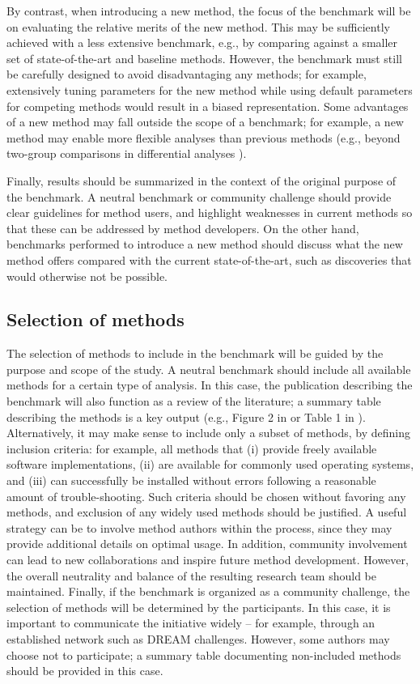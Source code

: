 By contrast, when introducing a new method, the focus of the benchmark will be on evaluating the relative merits of the new method. This may be sufficiently achieved with a less extensive benchmark, e.g., by comparing against a smaller set of state-of-the-art and baseline methods. However, the benchmark must still be carefully designed to avoid disadvantaging any methods; for example, extensively tuning parameters for the new method while using default parameters for competing methods would result in a biased representation. Some advantages of a new method may fall outside the scope of a benchmark; for example, a new method may enable more flexible analyses than previous methods (e.g., beyond two-group comparisons in differential analyses \cite{weber_diffcytdifferentialdiscovery_2019}).

Finally, results should be summarized in the context of the original purpose of the benchmark. A neutral benchmark or community challenge should provide clear guidelines for method users, and highlight weaknesses in current methods so that these can be addressed by method developers. On the other hand, benchmarks performed to introduce a new method should discuss what the new method offers compared with the current state-of-the-art, such as discoveries that would otherwise not be possible.

\subsection{Selection of methods}

The selection of methods to include in the benchmark will be guided by the purpose and scope of the study. A neutral benchmark should include all available methods for a certain type of analysis. In this case, the publication describing the benchmark will also function as a review of the literature; a summary table describing the methods is a key output (e.g., Figure 2 in \cite{saelens_comparisonsinglecelltrajectory_2019} or Table 1 in \cite{weber_comparisonclusteringmethods_2016}). Alternatively, it may make sense to include only a subset of methods, by defining inclusion criteria: for example, all methods that (i) provide freely available software implementations, (ii) are available for commonly used operating systems, and (iii) can successfully be installed without errors following a reasonable amount of trouble-shooting. Such criteria should be chosen without favoring any methods, and exclusion of any widely used methods should be justified. A useful strategy can be to involve method authors within the process, since they may provide additional details on optimal usage. In addition, community involvement can lead to new collaborations and inspire future method development. However, the overall neutrality and balance of the resulting research team should be maintained. Finally, if the benchmark is organized as a community challenge, the selection of methods will be determined by the participants. In this case, it is important to communicate the initiative widely -- for example, through an established network such as DREAM challenges. However, some authors may choose not to participate; a summary table documenting non-included methods should be provided in this case.

